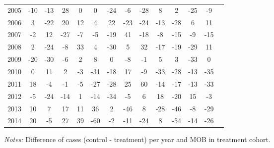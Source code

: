 \begin{table}[H]
\begin{threeparttable}
{\begin{tabular}{l*{13}{c}}
2005        &         -10&         -13&          28&           0&           0&         -24&          -6&         -28&           8&           2&         -25&          -9\\
2006        &           3&         -22&          20&          12&           4&          22&         -23&         -24&         -13&         -28&           6&          11\\
2007        &          -2&          12&         -27&          -7&          -5&         -19&          41&         -18&          -8&         -15&          -9&         -15\\
2008        &           2&         -24&          -8&          33&           4&         -30&           5&          32&         -17&         -19&         -29&          11\\
2009        &         -20&         -30&          -6&           2&           8&           0&          -8&          -1&           5&           3&         -33&           0\\
2010        &           0&          11&           2&          -3&         -31&         -18&          17&          -9&         -33&         -28&         -13&         -35\\
2011        &          18&          -4&          -1&          -5&         -27&         -28&          25&          60&         -14&         -17&         -13&         -33\\
2012        &          -5&         -24&         -14&           1&         -14&         -34&          -5&           6&          18&         -20&          15&          -3\\
2013        &          10&           7&          17&          11&          36&           2&         -46&           8&         -28&         -46&          -8&         -29\\
2014        &          20&          -5&          27&          39&         -60&          -2&         -11&         -24&           8&         -54&         -14&         -26\\
 \bottomrule \end{tabular} } \begin{tablenotes} \item \scriptsize \emph{Notes:} Difference of cases (control - treatment) per year and MOB in treatment cohort. \end{tablenotes} \end{threeparttable} \end{table} 
